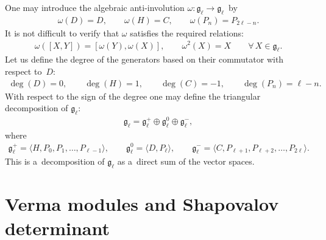 One may introduce the algebraic anti-involution $ \omega: {\mathfrak g}_{\ell} \to {\mathfrak g}_{\ell} $~by
\begin{gather*}
\omega(D) = D, \qquad \omega(H) = C, \qquad \omega(P_n) = P_{2\ell-n}.
\end{gather*}
It is not dif\/f\/icult to verify that $ \omega $ satisf\/ies the required relations:
\begin{gather*}
\omega([X,Y]) = [\omega(Y), \omega(X)], \qquad \omega^2(X) = X \qquad  \forall\, X \in {\mathfrak g}_{\ell}.
\end{gather*}
Let us def\/ine the degree of the generators based on their commutator with respect to~$D$:
\begin{gather*}
\deg(D) = 0, \qquad \deg(H) = 1, \qquad \deg(C) = -1, \qquad \deg(P_n) = \ell-n.
\end{gather*}
With respect to the sign of the degree one may def\/ine the triangular decomposition of ${\mathfrak g}_{\ell}$:
\begin{gather*}
    {\mathfrak g}_{\ell} = {\mathfrak g}_{\ell}^+ \oplus {\mathfrak g}_{\ell}^0 \oplus {\mathfrak g}_{\ell}^-,
\end{gather*}
where
\begin{gather*}
{\mathfrak g}_{\ell}^+ = \langle H, P_0, P_1, \dots, P_{\ell-1} \rangle,
\qquad
{\mathfrak g}_{\ell}^0 = \langle D, P_{\ell} \rangle,
\qquad
{\mathfrak g}_{\ell}^- = \langle C, P_{\ell+1}, P_{\ell+2}, \dots, P_{2\ell} \rangle.
\end{gather*}
This is a~decomposition of $ {\mathfrak g}_{\ell} $ as a~direct sum of the vector spaces.


\section{Verma modules and Shapovalov determinant}
\label{SEC:VM}

